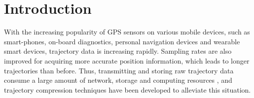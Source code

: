 \section{Introduction}
\label{sec-intro}



%
With the increasing popularity of GPS sensors on various mobile devices, such as smart-phones, on-board diagnostics, personal navigation devices and wearable smart devices, trajectory data is increasing rapidly. Sampling rates are also improved for acquiring more accurate position information, which leads to longer trajectories than before. Thus, transmitting and storing raw trajectory data consume a large amount of network, storage and computing resources \cite{Chen:Trajectory, Chen:Fast, Meratnia:Spatiotemporal, Keogh:online, Liu:BQS, Muckell:Compression,Cao:Spatio, Popa:Spatio, Schmid:Semantic,Richter:Semantic,Long:Direction,Nibali:Trajic}, and trajectory compression techniques \cite{Douglas:Peucker, Hershberger:Speeding, Meratnia:Spatiotemporal, Liu:BQS, Muckell:Compression, Chen:Trajectory, Chen:Fast, Keogh:online, Cao:Spatio, Shi:Survey, Richter:Semantic, Long:Direction, Song:PRESS, Nibali:Trajic} have been developed to alleviate this situation.
%
%
%

